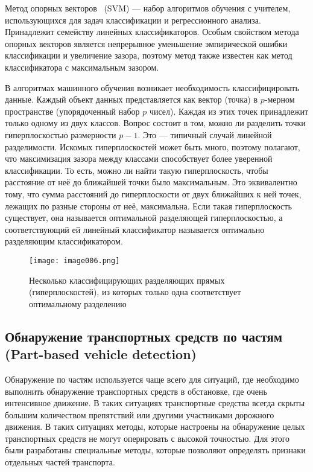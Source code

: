 Метод опорных векторов ~(SVM) — набор алгоритмов обучения с учителем, использующихся для задач классификации и регрессионного анализа. Принадлежит семейству линейных классификаторов. Особым свойством метода опорных векторов является непрерывное уменьшение эмпирической ошибки классификации и увеличение зазора, поэтому метод также известен как метод классификатора с максимальным зазором.

В алгоритмах машинного обучения возникает необходимость классифицировать данные. Каждый объект данных представляется как вектор (точка) в \(p\)-мерном пространстве (упорядоченный набор \(p\) чисел). Каждая из этих точек принадлежит только одному из двух классов. Вопрос состоит в том, можно ли разделить точки гиперплоскостью размерности \(p-1\). Это — типичный случай линейной разделимости. Искомых гиперплоскостей может быть много, поэтому полагают, что максимизация зазора между классами способствует более уверенной классификации. То есть, можно ли найти такую гиперплоскость, чтобы расстояние от неё до ближайшей точки было максимальным. Это эквивалентно тому, что сумма расстояний до гиперплоскости от двух ближайших к ней точек, лежащих по разные стороны от неё, максимальна. Если такая гиперплоскость существует, она называется оптимальной разделяющей гиперплоскостью, а соответствующий ей линейный классификатор называется оптимально разделяющим классификатором.

\begin{figure}[htbp]
\centering
\texttt{[image: image006.png]}
\caption{Несколько классифицирующих разделяющих прямых (гиперплоскостей), из которых только одна соответствует оптимальному разделению~\cite{nine}}%
\label{fig:how-to-do-research}
\end{figure}

\subsection{Обнаружение транспортных средств по частям (Part-based vehicle detection)}

Обнаружение по частям используется чаще всего для ситуаций, где необходимо выполнить обнаружение транспортных средств в обстановке, где очень интенсивное движение. В таких ситуациях транспортные средства всегда скрыты большим количеством препятствий или другими участниками дорожного движения. В таких ситуациях методы, которые настроены на обнаружение целых транспортных средств не могут оперировать с высокой точностью. Для этого были разработаны специальные методы, которые позволяют определять признаки отдельных частей транспорта.

